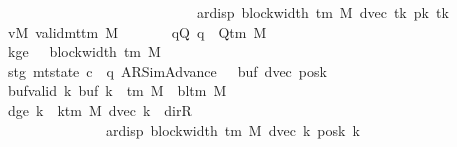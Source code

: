 \begin{isabellebody}
\ \ \ \ \ \ \ \ \ \ \ \ \ \ \ \ \ \ \ \ \ \ \ \ \ \ \ \ \ \ \ \ \ {\isacharminus}{\kern0pt}\ ar{\isacharunderscore}{\kern0pt}disp\ {\isacharparenleft}{\kern0pt}block{\isacharunderscore}{\kern0pt}width\ {\isacharparenleft}{\kern0pt}{\isasymGamma}{\isacharunderscore}{\kern0pt}tm\ M{\isacharparenright}{\kern0pt}{\isacharparenright}{\kern0pt}\ {\isacharparenleft}{\kern0pt}dvec\ tk{\isacharprime}{\kern0pt}{\isacharparenright}{\kern0pt}\ {\isacharparenleft}{\kern0pt}pk{\isacharprime}{\kern0pt}\ tk{\isacharprime}{\kern0pt}{\isacharparenright}{\kern0pt}{\isacharparenright}{\kern0pt}{\isacharparenright}{\kern0pt}{\isachardoublequoteclose}\isanewline
\ \ \ \ \ \ \ vM{\isacharcolon}{\kern0pt}\ {\isachardoublequoteopen}valid{\isacharunderscore}{\kern0pt}mttm\ M{\isachardoublequoteclose}\isanewline
\ \ \ \ \ \ \ qQ{\isacharcolon}{\kern0pt}\ {\isachardoublequoteopen}q\ {\isasymin}\ Q{\isacharunderscore}{\kern0pt}tm\ M{\isachardoublequoteclose}\isanewline
\ \ \ \ \ \ \ kge{}{\isacharcolon}{\kern0pt}\ {\isachardoublequoteopen}{}\ {\isasymle}\ block{\isacharunderscore}{\kern0pt}width\ {\isacharparenleft}{\kern0pt}{\isasymGamma}{\isacharunderscore}{\kern0pt}tm\ M{\isacharparenright}{\kern0pt}{\isachardoublequoteclose}\isanewline
\ \ \ \ \ \ \ stg{}{\isacharcolon}{\kern0pt}\ {\isachardoublequoteopen}mt{\isacharunderscore}{\kern0pt}state\ c{}\ {\isacharequal}{\kern0pt}\ {\isacharparenleft}{\kern0pt}q{\isacharcomma}{\kern0pt}\ AR{\isacharunderscore}{\kern0pt}SimAdvance{\isacharcomma}{\kern0pt}\ {}{\isacharcomma}{\kern0pt}\ {}{\isacharcomma}{\kern0pt}\ buf{}{\isacharcomma}{\kern0pt}\ dvec{\isacharcomma}{\kern0pt}\ posk{}{\isacharparenright}{\kern0pt}{\isachardoublequoteclose}\isanewline
\ \ \ \ \ \ \ buf{\isacharunderscore}{\kern0pt}valid{\isacharcolon}{\kern0pt}\ {\isachardoublequoteopen}{\isasymforall}k{\isachardot}{\kern0pt}\ buf{}\ k\ {\isasymin}\ {\isasymGamma}{\isacharunderscore}{\kern0pt}tm\ M\ {\isasymunion}\ {\isacharbraceleft}{\kern0pt}bl{\isacharunderscore}{\kern0pt}tm\ M{\isacharbraceright}{\kern0pt}{\isachardoublequoteclose}\isanewline
\ \ \ \ \ \ \ dge{}{\isacharcolon}{\kern0pt}\ {\isachardoublequoteopen}{\isasymforall}k\ {\isacharless}{\kern0pt}\ k{\isacharunderscore}{\kern0pt}tm\ M{\isachardot}{\kern0pt}\ dvec\ k\ {\isasymnoteq}\ dir{\isachardot}{\kern0pt}R\isanewline
\ \ \ \ \ \ \ \ \ \ \ \ \ \ \ \ \ \ {\isasymlongrightarrow}\ {}\ {\isacharless}{\kern0pt}\ ar{\isacharunderscore}{\kern0pt}disp\ {\isacharparenleft}{\kern0pt}block{\isacharunderscore}{\kern0pt}width\ {\isacharparenleft}{\kern0pt}{\isasymGamma}{\isacharunderscore}{\kern0pt}tm\ M{\isacharparenright}{\kern0pt}{\isacharparenright}{\kern0pt}\ {\isacharparenleft}{\kern0pt}dvec\ k{\isacharparenright}{\kern0pt}\ {\isacharparenleft}{\kern0pt}posk{}\ k{\isacharparenright}{\kern0pt}{\isachardoublequoteclose}\isanewline

\end{isabellebody}
